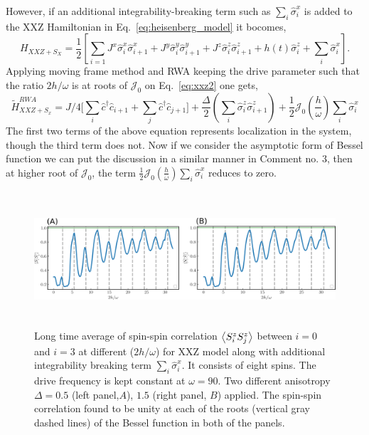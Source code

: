 \documentclass[aps,prb,reprint,showpacs,floatfix,superscriptaddress, onecolumn, nofootinbib, 9pt]{revtex4-2}
\begin{document}
\begin{enumerate}
{However, if an additional integrability-breaking term such as $\sum_i\hat{\sigma}^x_i$ is added to the XXZ Hamiltonian in Eq.~\eqref{eq:heisenberg_model} it bocomes,
\begin{equation}
	H_{XXZ+S_{X}} = \frac12 \left[ \sum_{i=1} J^x \hat{\sigma}^x_i \hat{\sigma}^x_{i+1} +J^y  \hat{\sigma}^y_i \hat{\sigma}^y_{i+1} + J^z  \hat{\sigma}^z_i \hat{\sigma}^z_{i+1} + h(t)  \hat{\sigma}^z_i + \sum_i\hat{\sigma}^x_i\right].
	\label{eq:xxz2}
\end{equation}
Applying moving frame method and RWA keeping the drive parameter such that the ratio $2h/\omega$ is at roots of $\mathcal{J}_0$ on Eq.~\eqref{eq:xxz2} one gets,
\begin{equation}
	\tilde{H}^{RWA}_{XXZ+S_{x}} = J/4\big[ \sum_i\hat{c}^\dagger\hat{c}_{i+1}  + \sum_j\hat{c}^\dagger\hat{c}_{j+1}\big] + \frac{\Delta}{2}\left(\sum_{i}  \hat{\sigma}_{i}^{z} \hat{\sigma}_{i+1}^{z}\right) +\frac12 \mathcal{J}_{0}\left(\frac{h}{\omega}\right) \sum_i\hat{\sigma}^x_i
	\label{eq:jwaxxzsx}
\end{equation}
The first two terms of the above equation represents localization in the system, though the third term does not. Now if we consider the asymptotic form of Bessel function we can put the discussion in a similar manner in Comment no. 3, then at higher root of $\mathcal{J}_0$, the term $\displaystyle \frac12 \mathcal{J}_{0}\left(\frac{h}{\omega}\right) \sum_i\hat{\sigma}^x_i$ reduces to zero. 
\begin{figure}[t]
	\includegraphics[height=5cm]{xxzsx.png}
	\caption{Long time average of spin-spin correlation $\expval{S^z_i S^z_{j}}$ between $i=0$ and $i=3$ at different ($2h/\omega$) for XXZ model along with additional integrability breaking term $\sum_i \hat{\sigma}^x_i$. It consists of eight spins. The drive frequency is kept constant at $\omega = 90$. Two different anisotropy $\Delta = 0.5$ (left panel,$A$), $1.5$ (right panel, $B$) applied. The spin-spin correlation found to be unity at each of the roots (vertical gray dashed lines) of the Bessel function in both of the panels.}
	\label{fig:xxzsx}
\end{figure}

}
\end{enumerate}
\end{document}
